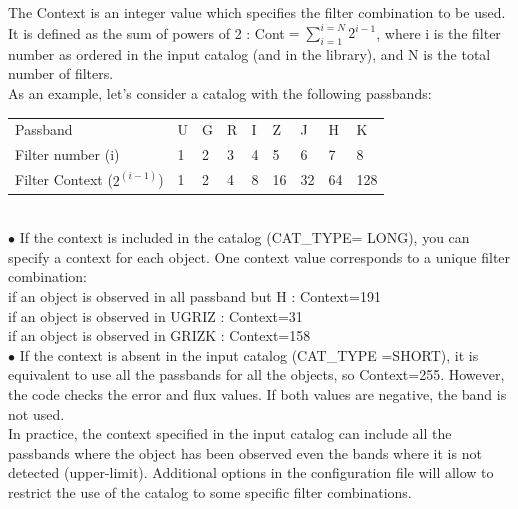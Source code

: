 \documentclass[12pt]{article}
\begin{document}
The Context is an integer value which specifies the filter combination to be used.  It is  defined as  the sum of powers of 2 : Cont$=\sum_{i=1}^{i=N} 2^{i-1}$,  where i is the filter number as ordered in the input catalog (and in the library), and N is  the total number of filters.  \\
  
As an example, let's consider a catalog with the following passbands:  \\
 
%
\vspace*{0.5cm}
\begin{tabular}{| l | l l l l l l l l |}
 \hline
    Passband                           &  U  &  G  &  R  &  I  &  Z  &  J   &  H     & K  \\
    Filter number (i)                  &  1  &   2  &  3  &  4  &  5  &  6   &   7     & 8     \\
    Filter Context ($2^{(i-1)}$)  &  1  &   2  &  4  &  8  & 16  & 32  &  64   & 128 \\
  \hline
\end{tabular} 
%
\vspace*{0.5cm} \\

\noindent $\bullet$  If the context is included in the catalog   (CAT\_TYPE= LONG), 
 you can specify a context for each object. One context value corresponds to a unique
 filter combination:\\
 \hspace*{1cm} if an object is observed in all passband but H :  Context=191 \\
 \hspace*{1cm} if an object is observed in UGRIZ : Context=31 \\
 \hspace*{1cm} if an object is observed in GRIZK : Context=158 \\

\noindent  $\bullet$  If the context is absent in the input catalog  (CAT\_TYPE =SHORT), 
 it is equivalent to use all the passbands for all the objects, so  Context=255.  However, the code checks  the error and flux values. If both values are negative, the band is not used. \\
  

 In practice,  the context specified in the input catalog can include all the passbands where
 the object has been observed  even the bands where it is not detected (upper-limit). 
 Additional options in the configuration file will allow  to restrict
 the  use of the catalog to some specific filter combinations.    \\
\end{document}
